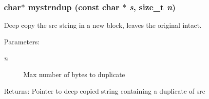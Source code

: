 \subsubsection{\setlength{\rightskip}{0pt plus 5cm}char$\ast$ mystrndup (const char $\ast$ {\em s}, size\_\-t {\em n})}\label{mystring_8c_9dc11eca5ee6b0e312610650bbe36e6d}


Deep copy the src string in a new block, leaves the original intact. 

\begin{Desc}
\item[Parameters:]
\begin{description}
\item[{\em n}]Max number of bytes to duplicate \end{description}
\end{Desc}
\begin{Desc}
\item[Returns:]Pointer to deep copied string containing a duplicate of src \end{Desc}
